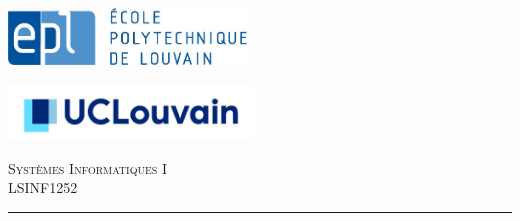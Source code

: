 \documentclass{article}
\begin{document}


\begin{titlepage} %
	\newcommand{\HRule}{\rule{\linewidth}{0.5mm}} %
	
	\begin{minipage}[t]{0.30\linewidth}
		\includegraphics[height=1.5cm]{Images/logo_EPL.jpg}
	\end{minipage} \hfill
	\begin{minipage}[t]{0.35\linewidth}
		\includegraphics[height=1.5cm]{Images/logo_UCL.jpg}
	\end{minipage}
	
	\center %
	
	
	
	
	\vspace{1.5cm}
	\textsc{\Large Systèmes Informatiques I}\\[0.5cm] %
	
	\textsc{\large LSINF1252}\\[1.0cm] %
	
	
	\HRule\\[0.65cm]
	

\end{titlepage}
\end{document}
